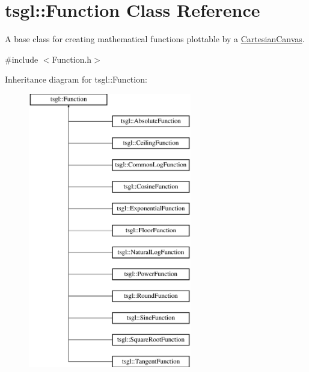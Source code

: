 \hypertarget{classtsgl_1_1_function}{}\section{tsgl\+:\+:Function Class Reference}
\label{classtsgl_1_1_function}


A base class for creating mathematical functions plottable by a \hyperlink{classtsgl_1_1_cartesian_canvas}{Cartesian\+Canvas}.  




{\ttfamily \#include $<$Function.\+h$>$}

Inheritance diagram for tsgl\+:\+:Function\+:\begin{figure}[H]
\begin{center}
\leavevmode
\includegraphics[height=12.000000cm]{classtsgl_1_1_function}
\end{center}
\end{figure}
